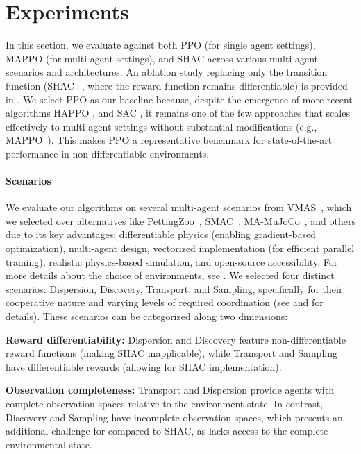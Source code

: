 
\section{Experiments}\label{sect:experiments}

In this section, we evaluate \fname{} against both PPO (for single agent settings), MAPPO (for multi-agent settings), and SHAC across various multi-agent scenarios and architectures. An ablation study replacing only the transition function (SHAC+, where the reward function remains differentiable) is provided in .
We select PPO as our baseline because, despite the emergence of more recent algorithms HAPPO \cite{Kuba2021TrustRM}, and SAC \cite{Haarnoja2018SoftAA}, it remains one of the few approaches that scales effectively to multi-agent settings without substantial modifications (e.g., MAPPO~\cite{DBLP:conf/nips/YuVVGWBW22}). This makes PPO a representative benchmark for state-of-the-art performance in non-differentiable environments.

\paragraph{Scenarios}
We evaluate our algorithms on several multi-agent scenarios from VMAS~\cite{DBLP:conf/dars/BettiniKBP22}, which we selected over alternatives like PettingZoo~\cite{DBLP:conf/icml/PettingZoo}, SMAC~\cite{DBLP:conf/icml/ZhangZLZ20}, MA-MuJoCo~\cite{DBLP:conf/aaai/GuptaK0G20}, and others due to its key advantages: differentiable physics (enabling gradient-based optimization), multi-agent design, vectorized implementation (for efficient parallel training), realistic physics-based simulation, and open-source accessibility.
For more details about the choice of environments, see .
We selected four distinct scenarios: Dispersion, Discovery, Transport, and Sampling, specifically for their cooperative nature and varying levels of required coordination (see  and  for details). These scenarios can be categorized along two dimensions:
\begin{compactitem}
    \item \textbf{Reward differentiability:} Dispersion and Discovery feature non-differentiable reward functions (making SHAC inapplicable), while Transport and Sampling have differentiable rewards (allowing for SHAC implementation).
    \item \textbf{Observation completeness:} Transport and Dispersion provide agents with complete observation spaces relative to the environment state. In contrast, Discovery and Sampling have incomplete observation spaces, which presents an additional challenge for \fname{} compared to SHAC, as \fname{} lacks access to the complete environmental state.
\end{compactitem}

